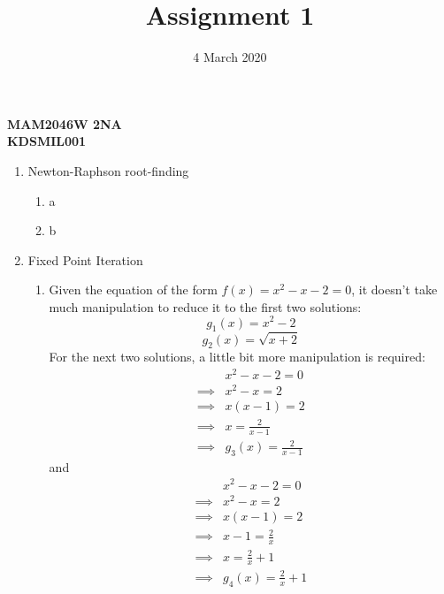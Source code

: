 \documentclass[12pt]{article}
\title{Assignment 1}
\date{4 March 2020}
\begin{document}
    \begin{titlepage}
        \maketitle
        \center
        \textbf{\large{MAM2046W 2NA}}\\[12pt]
        \textbf{\large{KDSMIL001}}\\
    \end{titlepage}

    \begin{enumerate}
        \item Newton-Raphson root-finding
        \begin{enumerate}
            \item a
            \item b
        \end{enumerate}
        \item Fixed Point Iteration
        \begin{enumerate}
            \item Given the equation of the form $f(x)=x^2-x-2=0$, it doesn't take much manipulation to 
            reduce it to the first two solutions:
            \begin{equation*}
                g_1(x) = x^2-2
            \end{equation*}
            \begin{equation*}
                g_2(x) = \sqrt{x+2}
            \end{equation*}
            For the next two solutions, a little bit more manipulation is required:
            \begin{equation*}
                \begin{split}
                    &x^2-x-2=0 \\
                    \implies &x^2-x=2 \\
                    \implies &x(x-1)=2 \\
                    \implies &x=\frac{2}{x-1} \\
                    \implies &g_3(x) = \frac{2}{x-1}
                \end{split}
            \end{equation*}
            and
            \begin{equation*}
                \begin{split}
                    &x^2-x-2=0 \\
                    \implies &x^2-x=2 \\
                    \implies &x(x-1)=2 \\
                    \implies &x-1=\frac{2}{x} \\
                    \implies &x=\frac{2}{x}+1 \\
                    \implies &g_4(x)=\frac{2}{x}+1
                \end{split}
            \end{equation*}


\end{enumerate}
\end{enumerate}
\end{document}
